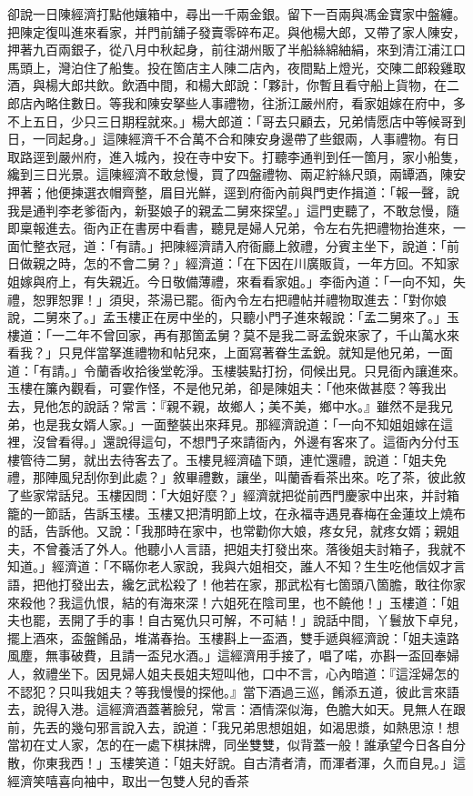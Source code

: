 卻說一日陳經濟打點他孃箱中，尋出一千兩金銀。留下一百兩與馮金寶家中盤纏。把陳定復叫進來看家，并門前舖子發賣零碎布疋。與他楊大郎，又帶了家人陳安，押著九百兩銀子，從八月中秋起身，前往湖州販了半船絲綿紬絹，來到清江浦江口馬頭上，灣泊住了船隻。投在箇店主人陳二店內，夜間點上燈光，交陳二郎殺雞取酒，與楊大郎共飲。飲酒中間，和楊大郎說：「夥計，你暫且看守船上貨物，在二郎店內略住數日。等我和陳安拏些人事禮物，往浙江嚴州府，看家姐嫁在府中，多不上五日，少只三日期程就來。」楊大郎道：「哥去只顧去，兄弟情愿店中等候哥到日，一同起身。」這陳經濟千不合萬不合和陳安身邊帶了些銀兩，人事禮物。有日取路逕到嚴州府，進入城內，投在寺中安下。打聽李通判到任一箇月，家小船隻，纔到三日光景。這陳經濟不敢怠慢，買了四盤禮物、兩疋紵絲尺頭，兩罈酒，陳安押著；他便揀選衣帽齊整，眉目光鮮，逕到府衙內前與門吏作揖道：「報一聲，說我是通判李老爹衙內，新娶娘子的親孟二舅來探望。」這門吏聽了，不敢怠慢，隨即稟報進去。衙內正在書房中看書，聽見是婦人兄弟，令左右先把禮物抬進來，一面忙整衣冠，道：「有請。」把陳經濟請入府衙廳上敘禮，分賓主坐下，說道：「前日做親之時，怎的不會二舅？」經濟道：「在下因在川廣販貨，一年方回。不知家姐嫁與府上，有失親近。今日敬備薄禮，來看看家姐。」李衙內道：「一向不知，失禮，恕罪恕罪！」須臾，茶湯已罷。衙內令左右把禮帖并禮物取進去：「對你娘說，二舅來了。」孟玉樓正在房中坐的，只聽小門子進來報說：「孟二舅來了。」玉樓道：「一二年不曾回家，再有那箇孟舅？莫不是我二哥孟銳來家了，千山萬水來看我？」只見伴當拏進禮物和帖兒來，上面寫著眷生孟銳。就知是他兄弟，一面道：「有請。」令蘭香收拾後堂乾淨。玉樓裝點打扮，伺候出見。只見衙內讓進來。玉樓在簾內觀看，可霎作怪，不是他兄弟，卻是陳姐夫：「他來做甚麼？等我出去，見他怎的說話？常言：『親不親，故鄉人；美不美，鄉中水。』雖然不是我兄弟，也是我女婿人家。」一面整裝出來拜見。那經濟說道：「一向不知姐姐嫁在這裡，沒曾看得。」還說得這句，不想門子來請衙內，外邊有客來了。這衙內分付玉樓管待二舅，就出去待客去了。玉樓見經濟磕下頭，連忙還禮，說道：「姐夫免禮，那陣風兒刮你到此處？」敘畢禮數，讓坐，叫蘭香看茶出來。吃了茶，彼此敘了些家常話兒。玉樓因問：「大姐好麼？」經濟就把從前西門慶家中出來，并討箱籠的一節話，告訴玉樓。玉樓又把清明節上坟，在永福寺遇見春梅在金蓮坟上燒布的話，告訴他。又說：「我那時在家中，也常勸你大娘，疼女兒，就疼女婿；親姐夫，不曾養活了外人。他聽小人言語，把姐夫打發出來。落後姐夫討箱子，我就不知道。」經濟道：「不瞞你老人家說，我與六姐相交，誰人不知？生生吃他信奴才言語，把他打發出去，纔乞武松殺了！他若在家，那武松有七箇頭八箇膽，敢往你家來殺他？我這仇恨，結的有海來深！六姐死在陰司里，也不饒他！」玉樓道：「姐夫也罷，丟開了手的事！自古冤仇只可解，不可結！」說話中間，丫鬟放下卓兒，擺上酒來，盃盤餚品，堆滿春抬。玉樓斟上一盃酒，雙手遞與經濟說：「姐夫遠路風塵，無事破費，且請一盃兒水酒。」這經濟用手接了，唱了喏，亦斟一盃回奉婦人，敘禮坐下。因見婦人姐夫長姐夫短叫他，口中不言，心內暗道：『這淫婦怎的不認犯？只叫我姐夫？等我慢慢的探他。』當下酒過三巡，餚添五道，彼此言來語去，說得入港。這經濟酒蓋著臉兒，常言：酒情深似海，色膽大如天。見無人在跟前，先丟的幾句邪言說入去，說道：「我兄弟思想姐姐，如渴思漿，如熱思涼！想當初在丈人家，怎的在一處下棋抹牌，同坐雙雙，似背蓋一般！誰承望今日各自分散，你東我西！」玉樓笑道：「姐夫好說。自古清者清，而渾者渾，久而自見。」這經濟笑嘻喜向袖中，取出一包雙人兒的香茶 